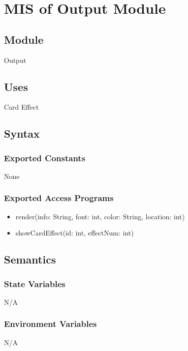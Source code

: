 \documentclass[12pt, titlepage]{article}
\begin{document}




\section{MIS of Output Module} 

\subsection{Module}
\hspace{1.5em}Output

\subsection{Uses}
\hspace{1.5em}Card Effect

\subsection{Syntax}

\subsubsection{Exported Constants}
\hspace{1.5em}None

\subsubsection{Exported Access Programs}

\begin{itemize}
\item render(info: String, font: int, color: String, location: int)
\item showCardEffect(id: int, effectNum: int)
\end{itemize}

\subsection{Semantics}

\subsubsection{State Variables}
\hspace{1.5em}N/A

\subsubsection{Environment Variables}
\hspace{1.5em}N/A
\end{document}
